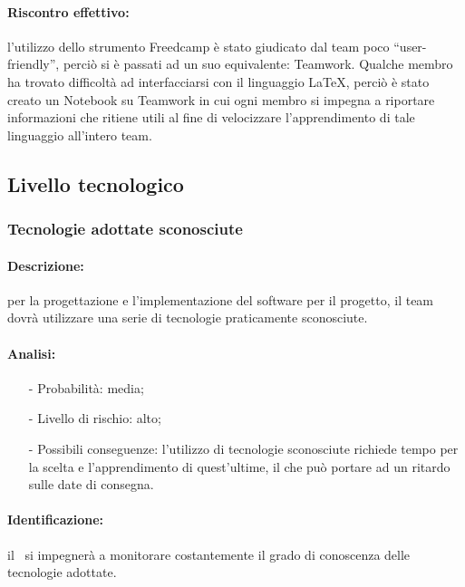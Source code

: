 \documentclass[../PianoProgetto.tex]{subfiles}
\begin{document}
	\paragraph*{Riscontro effettivo:} l’utilizzo dello strumento Freedcamp è stato giudicato dal team poco “user-friendly”, perciò si è passati ad un suo equivalente: Teamwork. 	Qualche membro ha trovato difficoltà ad interfacciarsi con il linguaggio LaTeX, perciò è stato creato un Notebook su Teamwork in cui ogni membro si impegna a riportare informazioni che ritiene utili al fine di velocizzare l’apprendimento di tale linguaggio all’intero team.

\subsection{Livello tecnologico}

\subsubsection{Tecnologie adottate sconosciute}

	\paragraph*{Descrizione:} per la progettazione e l’implementazione del software per il progetto, il team dovrà utilizzare una serie di tecnologie praticamente sconosciute.
	
	\paragraph*{Analisi:}
	\begin{itemize}
		\item[-] Probabilità: media;
		\item[-] Livello di rischio: alto;
		\item[-] Possibili conseguenze: l’utilizzo di tecnologie sconosciute richiede tempo per la scelta e l’apprendimento di quest’ultime, il che può portare ad un ritardo sulle date di consegna.
	\end{itemize}
	
	\paragraph*{Identificazione:} il \responsabilediprogetto\ si impegnerà a monitorare costantemente il grado di conoscenza delle tecnologie adottate.
	
\end{document}
